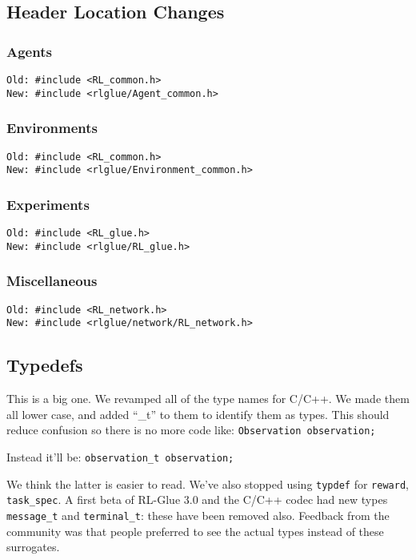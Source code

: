 \documentclass[11pt]{article}
\begin{document}
\subsection{Header Location Changes}
\subsubsection{Agents}
\begin{verbatim}
Old: #include <RL_common.h>
New: #include <rlglue/Agent_common.h>
\end{verbatim}

\subsubsection{Environments}
\begin{verbatim}
Old: #include <RL_common.h>
New: #include <rlglue/Environment_common.h>
\end{verbatim}

\subsubsection{Experiments}
\begin{verbatim}
Old: #include <RL_glue.h>
New: #include <rlglue/RL_glue.h>
\end{verbatim}

\subsubsection{Miscellaneous}
\begin{verbatim}
Old: #include <RL_network.h>
New: #include <rlglue/network/RL_network.h>
\end{verbatim}

\subsection{Typedefs}
This is a big one. We revamped all of the type names for C/C++.  We made them all lower case, and added ``\_t'' to them to identify them as types.  This should reduce confusion so there is no more code like:\newline
\texttt{Observation observation;}

Instead it'll be:\newline
\texttt{observation\_t observation;}

We think the latter is easier to read.  We've also stopped using \texttt{typdef} for \texttt{reward}, \texttt{task\_spec}.  A first beta of RL-Glue 3.0 and the C/C++ codec had new types \texttt{message\_t} and \texttt{terminal\_t}: these have been removed also.  Feedback from the community was that people preferred to see the actual types instead of these surrogates.
\end{document}
